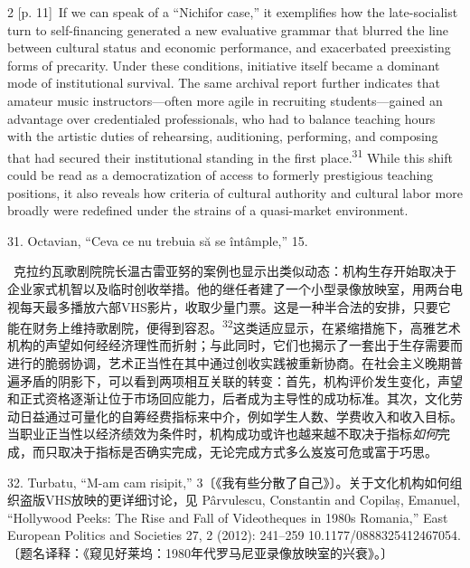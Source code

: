 \documentclass[10pt,a4paper]{article}
\begin{document}
\begin{paracol}{2}
\switchcolumn
{\scriptsize\color{gray} [p. 11]}\ If we can speak of a “Nichifor case,” it exemplifies how the late-socialist turn to self-financing generated a new evaluative grammar that blurred the line between cultural status and economic performance, and exacerbated preexisting forms of precarity. Under these conditions, initiative itself became a dominant mode of institutional survival. The same archival report further indicates that amateur music instructors—often more agile in recruiting students—gained an advantage over credentialed professionals, who had to balance teaching hours with the artistic duties of rehearsing, auditioning, performing, and composing that had secured their institutional standing in the first place.\nobreak\textsuperscript{31} While this shift could be read as a democratization of access to formerly prestigious teaching positions, it also reveals how criteria of cultural authority and cultural labor more broadly were redefined under the strains of a quasi-market environment.\par{\small 31. Octavian, “Ceva ce nu trebuia să se întâmple,” 15.\par}
\switchcolumn*
{\scriptsize\color{gray} [p. 11]}\ 克拉约瓦歌剧院院长温古雷亚努的案例也显示出类似动态：机构生存开始取决于企业家式机智以及临时创收举措。他的继任者建了一个小型录像放映室，用两台电视每天最多播放六部VHS影片，收取少量门票。这是一种半合法的安排，只要它能在财务上维持歌剧院，便得到容\mbox{忍。\textsuperscript{32}}这类适应显示，在紧缩措施下，高雅艺术机构的声望如何经经济理性而折射；与此同时，它们也揭示了一套出于生存需要而进行的脆弱协调，艺术正当性在其中通过创收实践被重新协商。在社会主义晚期普遍矛盾的阴影下，可以看到两项相互关联的转变：首先，机构评价发生变化，声望和正式资格逐渐让位于市场回应能力，后者成为主导性的成功标准。其次，文化劳动日益通过可量化的自筹经费指标来中介，例如学生人数、学费收入和收入目标。当职业正当性以经济绩效为条件时，机构成功或许也越来越不取决于指标\textit{如何}完成，而只取决于指标是否确实完成，无论完成方式多么岌岌可危或富于巧思。\par{\small 32. Turbatu, “M-am cam risipit,” 3〔《我有些分散了自己》〕。关于文化机构如何组织盗版VHS放映的更详细讨论，见 Pârvulescu, Constantin and Copilaș, Emanuel, “Hollywood Peeks: The Rise and Fall of Videotheques in 1980s Romania,” East European Politics and Societies 27, 2 (2012): 241–259 10.1177/0888325412467054. 〔题名译释：《窥见好莱坞：1980年代罗马尼亚录像放映室的兴衰》。〕\par}
\switchcolumn

\end{paracol}
\end{document}
